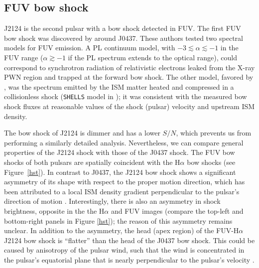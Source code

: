 \documentclass[iop]{emulateapj}
\begin{document}
\subsection{FUV bow shock}

J2124 is the second pulsar with a bow shock detected in FUV. The first FUV bow shock was discovered by \citet{2016ApJ...831..129R} around J0437. These authors tested two spectral models for FUV emission. A PL continuum model, with $-3\lesssim\alpha \lesssim -1$ in the FUV range ($\alpha \gtrsim -1$ if the PL spectrum extends to the optical range), could correspond to synchrotron radiation of relativistic electrons leaked from the X-ray PWN region and trapped at the forward bow shock. The other model, favored by \cite{2016ApJ...831..129R}, was the spectrum emitted by the ISM matter heated and compressed in a collisionless shock ({\tt SHELLS} model in \citealt{2013SSRv..178..599B}); it was consistent with the measured bow shock fluxes at reasonable values of the shock (pulsar) velocity and upstream ISM density.  

The bow shock of J2124 is dimmer and has a lower $S/N$, which prevents us from performing a similarly detailed analysis. Nevertheless, we can compare general properties of the J2124 shock with those of the J0437 shock. The FUV bow shocks of both pulsars are spatially coincident with the H$\alpha$ bow shocks (see Figure~\ref{hst}). In contrast to J0437, the J2124 bow shock shows a significant asymmetry of its shape with respect to the proper motion direction, which has been attributed to a local ISM density gradient perpendicular to the pulsar's direction of motion \citep{2002ApJ...580L.137G}. Interestingly, there is also an asymmetry in shock brightness, opposite in the the H$\alpha$ and FUV images (compare the top-left and bottom-right panels in Figure \ref{hst}); the reason of this asymmetry remains unclear. In addition to the asymmetry, the head (apex region) of the  FUV-H$\alpha$ J2124 bow shock is ``flatter'' than the head of the J0437 bow shock. This could be caused by anisotropy of the pulsar wind, such that the wind is concentrated in the pulsar's equatorial plane that is nearly perpendicular to the
pulsar's velocity \citep{2002ApJ...580L.137G,2014ApJ...784..154B}.
\end{document}
